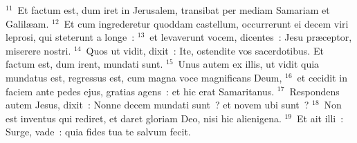 ${}^{11}$~Et factum est, dum iret in Jerusalem, transibat per mediam Samariam et Galil\ae am.
${}^{12}$~Et cum ingrederetur quoddam castellum, occurrerunt ei decem viri leprosi, qui steterunt a longe~:
${}^{13}$~et levaverunt vocem, dicentes~: Jesu pr\ae ceptor, miserere nostri.
${}^{14}$~Quos ut vidit, dixit~: Ite, ostendite vos sacerdotibus. Et factum est, dum irent, mundati sunt.
${}^{15}$~Unus autem ex illis, ut vidit quia mundatus est, regressus est, cum magna voce magnificans Deum,
${}^{16}$~et cecidit in faciem ante pedes ejus, gratias agens~: et hic erat Samaritanus.
${}^{17}$~Respondens autem Jesus, dixit~: Nonne decem mundati sunt~? et novem ubi sunt~?
${}^{18}$~Non est inventus qui rediret, et daret gloriam Deo, nisi hic alienigena.
${}^{19}$~Et ait illi~: Surge, vade~: quia fides tua te salvum fecit.


